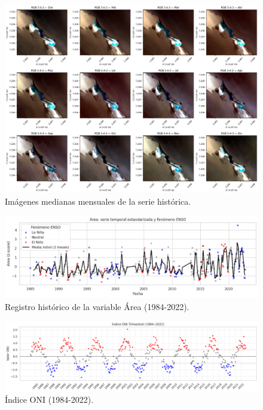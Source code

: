 \begin{figure}[ht]
        \centering
        \includegraphics[scale=.30]
        {Figures/mensualimg_.png}
        \caption{Imágenes medianas mensuales de la serie histórica.}
        \label{fig:img_mens}
\end{figure}


\begin{figure}[ht]
        \centering
        \includegraphics[scale=.45]
        {Figures/fig16_ts_area.png}
        \caption{Registro histórico de la variable Área (1984-2022).}
        \label{fig:indice_area}
\end{figure}


\begin{figure}[ht]
        \centering
        \includegraphics[scale=.38]
        {Figures/fig13_oni.png}
        \caption{Índice ONI (1984-2022).}
        \label{fig:indice_oni}
\end{figure}

